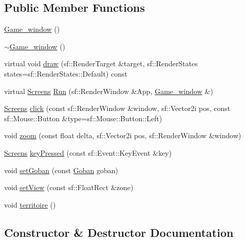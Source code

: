 \subsection*{Public Member Functions}
\begin{DoxyCompactItemize}
\item 
\hyperlink{class_game__window_a1d0ac99e8c117a5016883b52446c6530}{Game\+\_\+window} ()
\item 
\hyperlink{class_game__window_a5e84f0f55c4526bb0ea3a592c439c16f}{$\sim$\+Game\+\_\+window} ()
\item 
virtual void \hyperlink{class_game__window_aafdea9d00265261abfac6ad233b54638}{draw} (sf\+::\+Render\+Target \&target, sf\+::\+Render\+States states=sf\+::\+Render\+States\+::\+Default) const
\item 
virtual \hyperlink{_globals_8h_a3d5776bab98402b03be09156bacf4f68}{Screens} \hyperlink{class_game__window_aec21feecf4c72d73c13d82aa12df6930}{Run} (sf\+::\+Render\+Window \&App, \hyperlink{class_game__window}{Game\+\_\+window} \&)
\item 
\hyperlink{_globals_8h_a3d5776bab98402b03be09156bacf4f68}{Screens} \hyperlink{class_game__window_afa942088809bf10731bb31d0d37b878d}{click} (const sf\+::\+Render\+Window \&window, sf\+::\+Vector2i pos, const sf\+::\+Mouse\+::\+Button \&type=sf\+::\+Mouse\+::\+Button\+::\+Left)
\item 
void \hyperlink{class_game__window_a9b9b15469cb0ced1a22f28e447983b56}{zoom} (const float delta, sf\+::\+Vector2i pos, sf\+::\+Render\+Window \&window)
\item 
\hyperlink{_globals_8h_a3d5776bab98402b03be09156bacf4f68}{Screens} \hyperlink{class_game__window_a72304de2044c29f1373037bd818f674f}{key\+Pressed} (const sf\+::\+Event\+::\+Key\+Event \&key)
\item 
void \hyperlink{class_game__window_a35801adc41e40f90a36cff6db14defcd}{set\+Goban} (const \hyperlink{class_goban}{Goban} goban)
\item 
void \hyperlink{class_game__window_a5d130eb03ee63de5d63f91bcf6c56fa5}{set\+View} (const sf\+::\+Float\+Rect \&zone)
\item 
void \hyperlink{class_game__window_a8ad36b6ebe4760954dd01e94fc5762f1}{territoire} ()
\end{DoxyCompactItemize}


\subsection{Constructor \& Destructor Documentation}
\mbox{\label{class_game__window_a1d0ac99e8c117a5016883b52446c6530}} 

